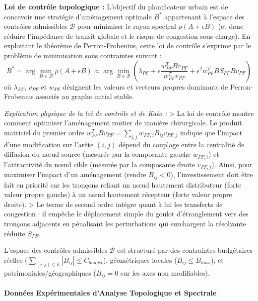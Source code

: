\documentclass[10pt, a4paper]{article}
\begin{document}
\textbf{Loi de contrôle topologique :} L'objectif du planificateur
urbain est de concevoir une stratégie d'aménagement optimale \(B^*\)
appartenant à l'espace des contrôles admissibles \(\mathcal{B}\) pour
minimiser le rayon spectral \(\rho(A + \epsilon B)\) (et donc réduire
l'impédance de transit globale et le risque de congestion sous charge).
En exploitant le théorème de Perron-Frobenius, cette loi de contrôle
s'exprime par le problème de minimisation sous contraintes suivant :
\[B^* = \arg\min_{B \in \mathcal{B}} \rho(A + \epsilon B) \approx \arg\min_{B \in \mathcal{B}} \left( \lambda_{PF} + \epsilon \frac{w_{PF}^T B v_{PF}}{w_{PF}^T v_{PF}} + \epsilon^2 w_{PF}^T B S_{PF} B v_{PF} \right)\]
où \(\lambda_{PF}\), \(v_{PF}\) et \(w_{PF}\) désignent les valeurs et
vecteurs propres dominants de Perron-Frobenius associés au graphe
initial stable.

\emph{Explication physique de la loi de contrôle et de Kato :}
\textgreater{} La loi de contrôle montre comment optimiser l'aménagement
routier de manière chirurgicale. Le produit matriciel du premier ordre
\(w_{PF}^T B v_{PF} = \sum_{i,j} w_{PF, i} B_{ij} v_{PF, j}\) indique
que l'impact d'une modification sur l'arête \((i, j)\) dépend du
couplage entre la centralité de diffusion du nœud source (mesurée par la
composante gauche \(w_{PF, i}\)) et l'attractivité du nœud cible
(mesurée par la composante droite \(v_{PF, j}\)). Ainsi, pour maximiser
l'impact d'un aménagement (rendre \(B_{ij} < 0\)), l'investissement doit
être fait en priorité sur les tronçons reliant un nœud hautement
distributeur (forte valeur propre gauche) à un nœud hautement récepteur
(forte valeur propre droite). \textgreater{} Le terme de second ordre
intègre quant à lui les transferts de congestion : il empêche le
déplacement simple du goulot d'étranglement vers des tronçons adjacents
en pénalisant les perturbations qui surchargent la résolvante réduite
\(S_{PF}\).

L'espace des contrôles admissibles \(\mathcal{B}\) est structuré par des
contraintes budgétaires réelles
(\(\sum_{(i,j) \in E} |B_{ij}| \le C_{budget}\)), géométriques locales
(\(B_{ij} \le B_{max}\)), et patrimoniales/géographiques (\(B_{ij} = 0\)
sur les axes non modifiables).

\paragraph{Données Expérimentales d'Analyse Topologique et
Spectrale}\label{donnuxe9es-expuxe9rimentales-danalyse-topologique-et-spectrale}
\end{document}
